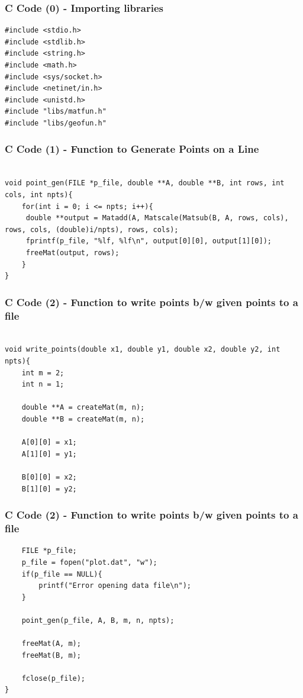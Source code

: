 \documentclass{beamer}
\begin{document}
\begin{frame}[fragile]
    \frametitle{C Code (0) - Importing libraries}

    \begin{lstlisting}
#include <stdio.h>
#include <stdlib.h>
#include <string.h>
#include <math.h>
#include <sys/socket.h>
#include <netinet/in.h>
#include <unistd.h>
#include "libs/matfun.h"
#include "libs/geofun.h"
    \end{lstlisting}
\end{frame}
\begin{frame}[fragile]
    \frametitle{C Code (1) - Function to Generate Points on a Line}

    \begin{lstlisting}

void point_gen(FILE *p_file, double **A, double **B, int rows, int cols, int npts){
    for(int i = 0; i <= npts; i++){
     double **output = Matadd(A, Matscale(Matsub(B, A, rows, cols), rows, cols, (double)i/npts), rows, cols);
     fprintf(p_file, "%lf, %lf\n", output[0][0], output[1][0]);
     freeMat(output, rows);
    } 
}

    \end{lstlisting}
\end{frame}


\begin{frame}[fragile]
    \frametitle{C Code (2) - Function to write points b/w given points to a file}

    \begin{lstlisting}

void write_points(double x1, double y1, double x2, double y2, int npts){
    int m = 2;
    int n = 1;

    double **A = createMat(m, n);
    double **B = createMat(m, n);

    A[0][0] = x1;
    A[1][0] = y1;

    B[0][0] = x2;
    B[1][0] = y2;
    \end{lstlisting}
\end{frame}
\begin{frame}[fragile]
    \frametitle{C Code (2) - Function to write points b/w given points to a file}

    \begin{lstlisting}
    FILE *p_file;
    p_file = fopen("plot.dat", "w");
    if(p_file == NULL){
        printf("Error opening data file\n");
    }

    point_gen(p_file, A, B, m, n, npts);

    freeMat(A, m);
    freeMat(B, m);

    fclose(p_file);
}


    \end{lstlisting}
\end{frame}
\end{document}
